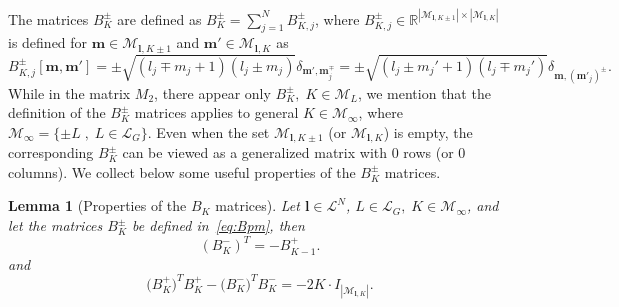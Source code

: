 \documentclass{article}
\newcommand{\card}[1]{|{#1}|}
\newtheorem{lemma}[theorem]{Lemma}
\numberwithin{equation}{section}
\def\R{\mathbb{R}}
\def\bl{{\bm l}}
\def\bbm{{\bm m}}
\def\calM{\mathcal{M}}
\def\calL{\mathcal{L}}
\def\MlL{{M}}
\def\Bpm{B^{\pm}}
\def\Bp{B^{+}}
\def\Bm{B^{-}}
\begin{document}
The matrices $\Bpm_{K}$ are defined as $\Bpm_{K}=\sum_{j=1}^N \Bpm_{K,j}$, where $\Bpm_{K,j}\in\R^{\card{\calM_{\bl,K\pm1}}\times\card{\calM_{\bl,K}}}$ is defined for $\bbm\in\calM_{\bl,K\pm1}$ and $\bbm' \in \calM_{\bl,K}$ as
\begin{equation}
\label{eq:Bpm}
        \Bpm_{K,j}[\bbm,\bbm'] 
        = \pm\sqrt{(l_j\mp m_j+1)(l_j\pm m_j)}\delta_{\bbm',\bbm_j^\mp} 
        = \pm\sqrt{(l_j\pm m_j'+1)(l_j\mp m_j')}\delta_{\bbm,({\bbm'}_j)^\pm}.
\end{equation}
While in the matrix $\MlL_2$, there appear only $B^\pm_K, \; K\in\calM_L$, we mention that the definition of the $B^\pm_K$ matrices applies to general $K\in\calM_\infty$, where $\calM_\infty=\{\pm L \;,\; L\in\calL_G\}$. Even when the set $\calM_{\bl,K \pm 1}$ (or $\calM_{\bl,K}$) is empty, the corresponding $B^\pm_K$ can be viewed as a generalized matrix with 0 rows (or 0 columns). We collect below some useful properties of the $B^\pm_K$ matrices. 

\begin{lemma}[Properties of the $B_K$ matrices]\label{lemma:laddar}
    Let $\bl\in\calL^N$, $L\in\calL_G,\;K\in\calM_\infty$, 
    and let the matrices $B_K^\pm$ be defined in~\eqref{eq:Bpm}, then
    \begin{equation}\label{eq:Bequality}
        (B_{K}^-)^T = -B_{{K-1}}^+.
    \end{equation}
    and
    \begin{equation}
        \big(\Bp_K\big)^T\Bp_K  - \big(\Bm_K\big)^T\Bm_K 
     = -2K\cdot I_{\card{\calM_{\bl,K}}}\label{eq:ladder2}.
    \end{equation}
\end{lemma}
\end{document}

